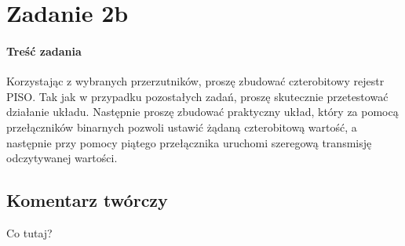 \documentclass{article}
\begin{document}
\section{Zadanie 2b}
\paragraph{Treść zadania}
Korzystając z wybranych przerzutników, proszę zbudować czterobitowy rejestr PISO. Tak jak w przypadku pozostałych zadań, proszę skutecznie przetestować działanie układu. Następnie proszę zbudować praktyczny układ, który za pomocą przełączników binarnych pozwoli ustawić żądaną czterobitową wartość, a następnie przy pomocy piątego przełącznika uruchomi szeregową transmisję odczytywanej wartości.
\subsection{Komentarz twórczy}
 Co tutaj?
\end{document}

